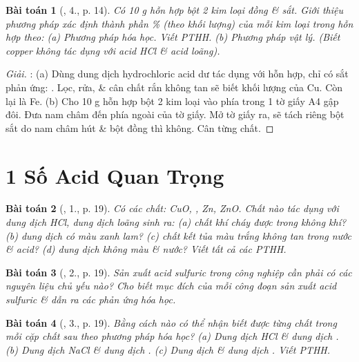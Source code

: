 \documentclass{article}
\newtheorem{baitoan}{Bài toán}
\begin{document}
\begin{baitoan}[\cite{SGK_Hoa_Hoc_9}, 4., p. 14]
	Có {\rm10 g} hỗn hợp bột 2 kim loại đồng \& sắt. Giới thiệu phương pháp xác định thành phần \% (theo khối lượng) của mỗi kim loại trong hỗn hợp theo: (a) Phương pháp hóa học. Viết PTHH. (b) Phương pháp vật lý. (Biết copper không tác dụng với acid {\rm HCl} \& acid {\rm{}} loãng).
\end{baitoan}

\begin{proof}[Giải]
	\cite[p. 12]{Ninh_giai_BT_Hoa_Hoc_9}: (a) Dùng dung dịch hydrochloric acid dư tác dụng với hỗn hợp, chỉ có sắt phản ứng: . Lọc, rửa, \& cân chất rắn không tan sẽ biết khối lượng của Cu. Còn lại là Fe. (b) Cho 10 g hỗn hợp bột 2 kim loại vào phía trong 1 tờ giấy A4 gập đôi. Đưa nam châm đến phía ngoài của tờ giấy. Mở tờ giấy ra, sẽ tách riêng bột sắt do nam châm hút \& bột đồng thì không. Cân từng chất.
\end{proof}


\section{1 Số Acid Quan Trọng}

\begin{baitoan}[\cite{SGK_Hoa_Hoc_9}, 1., p. 19]
	Có các chất: {\rm CuO, , Zn, ZnO}. Chất nào tác dụng với dung dịch {\rm HCl}, dung dịch {\rm{}} loãng sinh ra: (a) chất khí cháy được trong không khí? (b) dung dịch có màu xanh lam? (c) chất kết tủa màu trắng không tan trong nước \& acid? (d) dung dịch không màu \& nước? Viết tất cả các {\rm PTHH}.
\end{baitoan}

\begin{baitoan}[\cite{SGK_Hoa_Hoc_9}, 2., p. 19]
	Sản xuất acid sulfuric trong công nghiệp cần phải có các nguyên liệu chủ yếu nào? Cho biết mục đích của mỗi công đoạn sản xuất acid sulfuric \& dẫn ra các phản ứng hóa học.
\end{baitoan}

\begin{baitoan}[\cite{SGK_Hoa_Hoc_9}, 3., p. 19]
	Bằng cách nào có thể nhận biết được từng chất trong mỗi cặp chất sau theo phương pháp hóa học? (a) Dung dịch {\rm HCl} \& dung dịch {\rm{}}. (b) Dung dịch {\rm NaCl} \& dung dịch {\rm{}}. (c) Dung dịch {\rm{}} \& dung dịch {\rm{}}. Viết {\rm PTHH}.
\end{baitoan}
\end{document}
